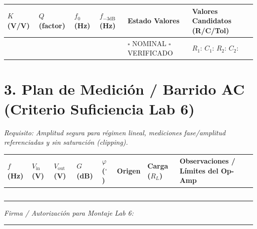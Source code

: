 \documentclass[10pt, a4paper]{article}
\begin{document}
\begin{table}[htbp]
    \centering
    \small
    \renewcommand{\arraystretch}{1.5}
    \begin{tabularx}{\textwidth}{|P{2cm}|P{2cm}|P{2cm}|P{2cm}|P{3cm}|Y|}
    \hline
    \textbf{$K$ (V/V)} & \textbf{$Q$ (factor)} & \textbf{$f_0$ (Hz)} & \textbf{$f_{-3\mathrm{dB}}$ (Hz)} & \textbf{Estado Valores} & \textbf{Valores Candidatos (R/C/Tol)} \\ \hline
     & & & & $\square$ NOMINAL \newline $\square$ VERIFICADO & $R_1$: \quad $C_1$: \newline $R_2$: \quad $C_2$: \\ \hline
    \end{tabularx}
\end{table}

\section*{3. Plan de Medición / Barrido AC (Criterio Suficiencia Lab 6)}
\textit{Requisito: Amplitud segura para régimen lineal, mediciones fase/amplitud referenciadas y sin saturación (clipping).}

\begin{table}[htbp]
    \centering
    \scriptsize
    \renewcommand{\arraystretch}{1.4}
    \begin{tabularx}{\textwidth}{|P{1.2cm}|P{1.5cm}|P{1.5cm}|P{1.2cm}|P{1.2cm}|P{1.5cm}|P{1.8cm}|Y|}
    \hline
    \textbf{$f$ (Hz)} & \textbf{$V_{\mathrm{in}}$ (V)} & \textbf{$V_{\mathrm{out}}$ (V)} & \textbf{$G$ (dB)} & \textbf{$\varphi$ ($^\circ$)} & \textbf{Origen} & \textbf{Carga ($R_L$)} & \textbf{Observaciones / Límites del Op-Amp} \\ \hline
     & & & & & & & \\ \hline
     & & & & & & & \\ \hline
     & & & & & & & \\ \hline
     & & & & & & & \\ \hline
     & & & & & & & \\ \hline
    \end{tabularx}
\end{table}
\noindent\textit{Firma / Autorización para Montaje Lab 6:} \rule{4cm}{0.4pt}
\end{document}
